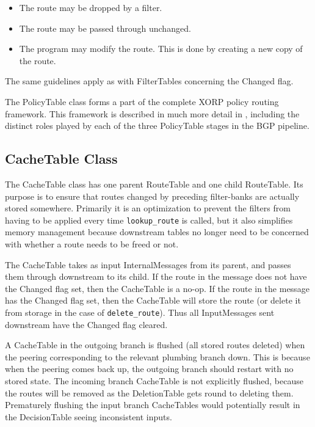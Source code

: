 \documentclass[11pt]{article}
\begin{document}
\begin{itemize}

  \item The route may be dropped by a filter.

  \item The route may be passed through unchanged.

  \item The program may modify the route.  This is done by
  creating a new copy of the route.

\end{itemize}

The same guidelines apply as with FilterTables concerning the Changed flag.

The PolicyTable class forms a part of the complete XORP policy routing
framework. This framework is described in much more detail in
\cite{bittau:unpublished2006:xorp_policy}, including the distinct roles
played by each of the three PolicyTable stages in the BGP pipeline.

\subsection{CacheTable Class}

The CacheTable class has one parent RouteTable and one child
RouteTable.  Its purpose is to ensure that routes changed by preceding
filter-banks are actually stored somewhere.  Primarily it is an
optimization to prevent the filters from having to be applied every
time {\tt lookup\_route} is called, but it also simplifies memory management
because downstream tables no longer need to be concerned with whether
a route needs to be freed or not. 

The CacheTable takes as input InternalMessages from its parent, and
passes them through downstream to its child.  If the route in the
message does not have the Changed flag set, then the CacheTable is a
no-op.  If the route in the message has the Changed flag set, then the
CacheTable will store the route (or delete it from storage in the case
of {\tt delete\_route}).  Thus all InputMessages sent downstream have the
Changed flag cleared.

A CacheTable in the outgoing branch is flushed (all stored routes
deleted) when the peering corresponding to the relevant plumbing
branch down.  This is because when the peering comes back up, the
outgoing branch should restart with no stored state.  The incoming
branch CacheTable is not explicitly flushed, because the routes will
be removed as the DeletionTable gets round to deleting them.
Prematurely flushing the input branch CacheTables would potentially
result in the DecisionTable seeing inconsistent inputs.
\end{document}
